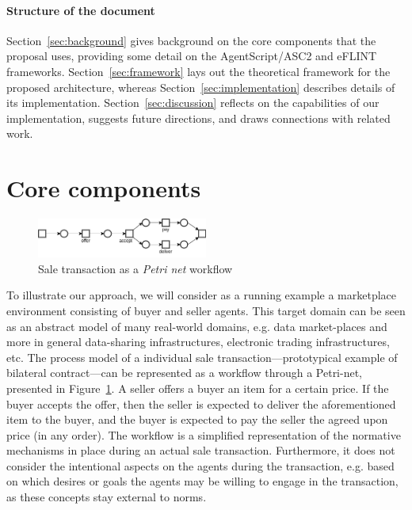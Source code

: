 \paragraph{Structure of the document}
Section~\ref{sec:background} gives background on the core components that the proposal uses, providing some detail on the AgentScript/ASC2 and eFLINT frameworks. Section~\ref{sec:framework} lays out the theoretical framework for the proposed architecture, whereas Section~\ref{sec:implementation} describes details of its implementation. Section~\ref{sec:discussion} reflects on the capabilities of our implementation, suggests future directions, and draws connections with related work.


\section{Core components\label{sec:background}}

\begin{figure}[!tb]
    \centering
    \includegraphics[width=0.5\textwidth]{ch_eumas/sale-drawio.png}
    \caption{Sale transaction as a \textit{Petri net} workflow}
    \label{fig:sale}
\end{figure}
%

To illustrate our approach, we will consider as a running example a marketplace environment consisting of buyer and seller agents. This target domain can be seen as an abstract model of many real-world domains, e.g. data market-places and more in general data-sharing infrastructures, electronic trading infrastructures, etc. The process model of a individual sale transaction---prototypical example of bilateral contract---can be represented as a workflow through a Petri-net, presented in Figure~\ref{fig:sale}. A seller offers a buyer an item for a certain price. If the buyer accepts the offer, then the seller is expected to deliver the aforementioned item to the buyer, and the buyer is expected to pay the seller the agreed upon price (in any order). The workflow is a simplified representation of the normative mechanisms in place during an actual sale transaction. Furthermore, it does not consider the intentional aspects on the agents during the transaction, e.g. based on which desires or goals the agents may be willing to engage in the transaction, as these concepts stay external to norms.
%
